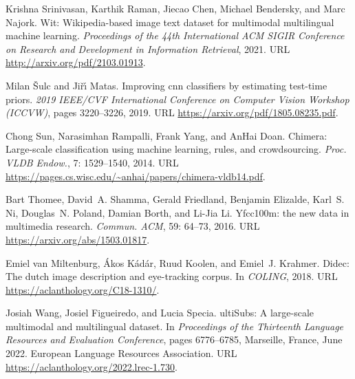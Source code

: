 \documentclass{bmvc2k}
\begin{document}
\begin{thebibliography}{63}
Krishna Srinivasan, Karthik Raman, Jiecao Chen, Michael Bendersky, and Marc
  Najork.
\newblock Wit: Wikipedia-based image text dataset for multimodal multilingual
  machine learning.
\newblock \emph{Proceedings of the 44th International ACM SIGIR Conference on
  Research and Development in Information Retrieval}, 2021.
\newblock URL \url{http://arxiv.org/pdf/2103.01913}.

Milan {\v{S}}ulc and Ji{\v{r}}{\'\i} Matas.
\newblock Improving cnn classifiers by estimating test-time priors.
\newblock \emph{2019 IEEE/CVF International Conference on Computer Vision
  Workshop (ICCVW)}, pages 3220--3226, 2019.
\newblock URL \url{https://arxiv.org/pdf/1805.08235.pdf}.

Chong Sun, Narasimhan Rampalli, Frank Yang, and AnHai Doan.
\newblock Chimera: Large-scale classification using machine learning, rules,
  and crowdsourcing.
\newblock \emph{Proc. VLDB Endow.}, 7: 1529--1540, 2014.
\newblock URL \url{https://pages.cs.wisc.edu/~anhai/papers/chimera-vldb14.pdf}.

Bart Thomee, David~A. Shamma, Gerald Friedland, Benjamin Elizalde, Karl~S. Ni,
  Douglas~N. Poland, Damian Borth, and Li-Jia Li.
\newblock Yfcc100m: the new data in multimedia research.
\newblock \emph{Commun. ACM}, 59: 64--73, 2016.
\newblock URL \url{https://arxiv.org/abs/1503.01817}.

Emiel van Miltenburg, {\'A}kos K{\'a}d{\'a}r, Ruud Koolen, and Emiel~J.
  Krahmer.
\newblock Didec: The dutch image description and eye-tracking corpus.
\newblock In \emph{COLING}, 2018.
\newblock URL \url{https://aclanthology.org/C18-1310/}.

Josiah Wang, Josiel Figueiredo, and Lucia Specia.
ulti{S}ubs: A large-scale multimodal and multilingual dataset.
\newblock In \emph{Proceedings of the Thirteenth Language Resources and
  Evaluation Conference}, pages 6776--6785, Marseille, France, June 2022.
  European Language Resources Association.
\newblock URL \url{https://aclanthology.org/2022.lrec-1.730}.


\end{thebibliography}
\end{document}
